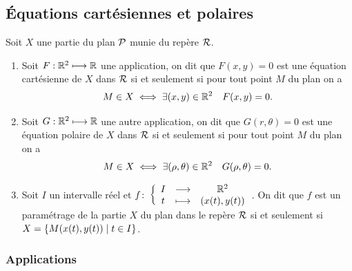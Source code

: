 \subsection{Équations cartésiennes et polaires}
\label{subsec:equationspoletcoordcart}
Soit $X$ une partie du plan $\P$ munie du repère $\Rep$.
\begin{defdef}
  \begin{enumerate}
  \item Soit $F:\R^2 \longmapsto \R$ une application, on dit que $F(x,y)=0$ est une équation cartésienne de $X$ dans $\Rep$ si et seulement si pour tout point $M$ du plan on a
    \begin{equation}
      M \in X \iff \exists (x,y)\in\R^2 \quad F(x,y)=0.
    \end{equation}
  \item Soit $G:\R^2 \longmapsto \R$ une autre application, on dit que $G(r,\theta)=0$ est une équation polaire de $X$ dans $\Rep$ si et seulement si pour tout point $M$ du plan on a
      \begin{equation}
        M \in X \iff \exists (\rho, \theta)\in\R^2 \quad G(\rho,\theta)=0.
      \end{equation}
  \item Soit $I$ un intervalle réel et $\fonction{f}{I}{\R^2}{t}{(x(t),y(t))}$. On dit que $f$ est un paramétrage de la partie $X$ du plan dans le repère $\Rep$ si et seulement si $X=\enstq{M(x(t),y(t))}{t \in I}$.
  \end{enumerate}
\end{defdef}
%
\subsubsection{Applications}
\label{subsubsec:applicationeqcartetpol}
